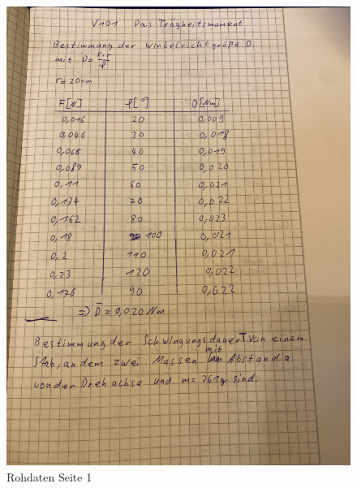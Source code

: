 \begin{figure}
  \centering
  \includegraphics[width=\textwidth, angle=270]{Bilder/Data1.jpg}
  \caption{Rohdaten Seite 1}
  \label{fig:Data1}
\end{figure}
